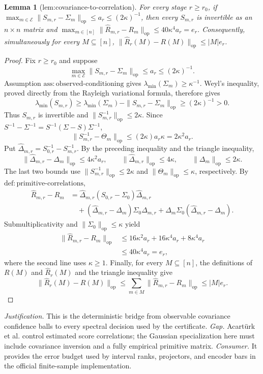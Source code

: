 \documentclass{article}
\newtheorem{lemma}{Lemma}
\begin{document}
\begin{lemma}[lem:covariance-to-correlation]\label{lem:covariance-to-correlation}
For every stage \(r\ge r_0\), if \(\max_{m\in\mathcal E}\|S_{m,r}-\Sigma_m\|_{\mathrm{op}}\le a_r\le(2\kappa)^{-1}\), then every \(S_{m,r}\) is invertible as an \(n\times n\) matrix and \(\max_{m\in[n]}\|\widehat R_{m,r}-R_m\|_{\mathrm{op}}\le40\kappa^4a_r=e_r\). Consequently, simultaneously for every \(M\subseteq[n]\), \(\|\widehat R_r(M)-R(M)\|_{\mathrm{op}}\le |M|e_r\).
\end{lemma}
\begin{proof}
Fix \(r\ge r_0\) and suppose
\[
 \max_{m\in\mathcal E}\|S_{m,r}-\Sigma_m\|_{\mathrm{op}}
 \le a_r\le (2\kappa)^{-1}.
\]
Assumption \(\mathrm{ass{:}observed\mbox{-}conditioning}\) gives
\(\lambda_{\min}(\Sigma_m)\ge\kappa^{-1}\).  Weyl's inequality, proved directly from the Rayleigh variational formula, therefore gives
\[
 \lambda_{\min}(S_{m,r})
 \ge \lambda_{\min}(\Sigma_m)-\|S_{m,r}-\Sigma_m\|_{\mathrm{op}}
 \ge (2\kappa)^{-1}>0.
\]
Thus \(S_{m,r}\) is invertible and
\(\|S_{m,r}^{-1}\|_{\mathrm{op}}\le2\kappa\).  Since
\(S^{-1}-\Sigma^{-1}=S^{-1}(\Sigma-S)\Sigma^{-1}\),
\[
 \|S_{m,r}^{-1}-\Theta_m\|_{\mathrm{op}}
 \le (2\kappa)a_r\kappa=2\kappa^2a_r.
\]
Put \(\widehat\Delta_{m,r}=S_{0,r}^{-1}-S_{m,r}^{-1}\).  By the preceding inequality and the triangle inequality,
\[
 \|\widehat\Delta_{m,r}-\Delta_m\|_{\mathrm{op}}
 \le4\kappa^2a_r,
 \qquad
 \|\widehat\Delta_{m,r}\|_{\mathrm{op}}
 \le4\kappa,
 \qquad
 \|\Delta_m\|_{\mathrm{op}}
 \le2\kappa.
\]
The last two bounds use \(\|S_{m,r}^{-1}\|_{\mathrm{op}}\le2\kappa\) and \(\|\Theta_m\|_{\mathrm{op}}\le\kappa\), respectively.  By \(\mathrm{def{:}primitive\mbox{-}correlations}\),
\[
\begin{aligned}
 \widehat R_{m,r}-R_m
 &=\widehat\Delta_{m,r}(S_{0,r}-\Sigma_0)\widehat\Delta_{m,r}\\
 &\quad +(\widehat\Delta_{m,r}-\Delta_m)\Sigma_0\widehat\Delta_{m,r}
       +\Delta_m\Sigma_0(\widehat\Delta_{m,r}-\Delta_m).
\end{aligned}
\]
Submultiplicativity and \(\|\Sigma_0\|_{\mathrm{op}}\le\kappa\) yield
\[
\begin{aligned}
 \|\widehat R_{m,r}-R_m\|_{\mathrm{op}}
 &\le16\kappa^2a_r+16\kappa^4a_r+8\kappa^4a_r\\
 &\le40\kappa^4a_r=e_r,
\end{aligned}
\]
where the second line uses \(\kappa\ge1\).  Finally, for every \(M\subseteq[n]\), the definitions of \(R(M)\) and \(\widehat R_r(M)\) and the triangle inequality give
\[
 \|\widehat R_r(M)-R(M)\|_{\mathrm{op}}
 \le\sum_{m\in M}\|\widehat R_{m,r}-R_m\|_{\mathrm{op}}
 \le |M|e_r.
\]
\end{proof}
\par\smallskip\noindent \textit{Justification.} This is the deterministic bridge from observable covariance confidence balls to every spectral decision used by the certificate. \textit{Gap.} Acartürk et al. control estimated score correlations; the Gaussian specialization here must include covariance inversion and a fully empirical primitive matrix. \textit{Consumer.} It provides the error budget used by interval ranks, projectors, and encoder bars in the official finite-sample implementation.
\end{document}
